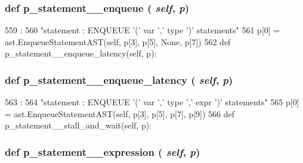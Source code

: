 \begin{DoxyVerb}
{\subsubsection[{p\_\-statement\_\-\_\-enqueue}]{\setlength{\rightskip}{0pt plus 5cm}def p\_\-statement\_\-\_\-enqueue ( {\em self}, \/   {\em p})}}
\label{classslicc_1_1parser_1_1SLICC_aa24de70d62c542b3a2c70537e8d9c545}



\begin{DoxyCode}
559                                      :
560         "statement : ENQUEUE '(' var ',' type ')' statements"
561         p[0] = ast.EnqueueStatementAST(self, p[3], p[5], None, p[7])
562 
    def p_statement__enqueue_latency(self, p):
\end{DoxyCode}
\hypertarget{classslicc_1_1parser_1_1SLICC_a125c36bced168577e807e3f9b7db389d}{
\subsubsection[{p\_\-statement\_\-\_\-enqueue\_\-latency}]{\setlength{\rightskip}{0pt plus 5cm}def p\_\-statement\_\-\_\-enqueue\_\-latency ( {\em self}, \/   {\em p})}}
\label{classslicc_1_1parser_1_1SLICC_a125c36bced168577e807e3f9b7db389d}



\begin{DoxyCode}
563                                              :
564         "statement : ENQUEUE '(' var ',' type ',' expr ')' statements"
565         p[0] = ast.EnqueueStatementAST(self, p[3], p[5], p[7], p[9])
566 
    def p_statement__stall_and_wait(self, p):
\end{DoxyCode}
\hypertarget{classslicc_1_1parser_1_1SLICC_a21197ae4e4e8767d8c174b973ccac760}{
\subsubsection[{p\_\-statement\_\-\_\-expression}]{\setlength{\rightskip}{0pt plus 5cm}def p\_\-statement\_\-\_\-expression ( {\em self}, \/   {\em p})}}
\label{classslicc_1_1parser_1_1SLICC_a21197ae4e4e8767d8c174b973ccac760}




\end{DoxyVerb}
